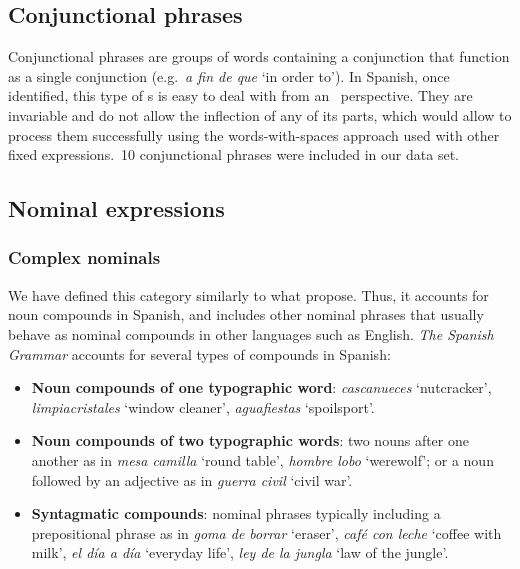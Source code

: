\documentclass[output=paper]{langsci/langscibook}
\begin{document}
\subsection{Conjunctional phrases}
\label{sssec:conjunctionalPhrases}

Conjunctional phrases are groups of words containing a conjunction that function as a single conjunction (e.g.\ \textit{a fin de que} `in order to').
In Spanish, once identified, this type of \mwe s is easy to deal with from an \nlp\ perspective.
They are invariable and do not allow the inflection of any of its parts, which would allow to process them successfully using the words-with-spaces approach used with other fixed expressions.\ 10 conjunctional phrases were included in our data set.


\subsection{Nominal expressions}
\label{sssec:nominalExpressions}

\subsubsection{Complex nominals}
\label{ssssec:complexNominals}

We have defined this category similarly to what \citet{Atkins:2001} propose.
Thus, it accounts for noun compounds in Spanish, and includes other nominal phrases that usually behave as nominal compounds in other languages such as English.
\textit{The Spanish Grammar} \citeyearpar{RAE:2010} accounts for several types of compounds in Spanish:

\begin{itemize}
\item \textbf{Noun compounds of one typographic word}: \textit{cascanueces} `nutcracker', \textit{limpiacristales} `window cleaner', \textit{aguafiestas} `spoilsport'.
\item \textbf{Noun compounds of two typographic words}: two nouns after one another as in \textit{mesa camilla} `round table', \textit{hombre lobo} `werewolf'; or a noun followed by an adjective as in \textit{guerra civil} `civil war'.
\item \textbf{Syntagmatic compounds}: nominal phrases typically including a prepositional phrase as in \textit{goma de borrar} `eraser', \textit{café con leche} `coffee with milk', \textit{el día a día} `everyday life', \textit{ley de la jungla} `law of the jungle'.
\end{itemize}
\end{document}
